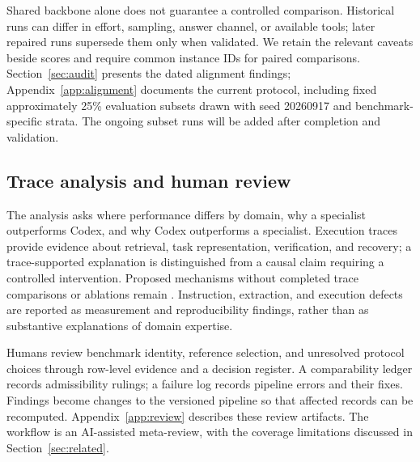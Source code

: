 Shared backbone alone does not guarantee a controlled comparison. Historical runs can differ in
effort, sampling, answer channel, or available tools; later repaired runs supersede them only when
validated. We retain the relevant caveats beside scores and require common instance IDs for
paired comparisons. Section~\ref{sec:audit} presents the dated alignment findings;
Appendix~\ref{app:alignment} documents the current protocol, including fixed approximately
25\% evaluation subsets drawn with seed 20260917 and benchmark-specific strata. The ongoing
subset runs will be added after completion and validation.

\subsection{Trace analysis and human review}
\label{sec:method:human}

The analysis asks where performance differs by domain, why a specialist outperforms Codex, and
why Codex outperforms a specialist. Execution traces provide evidence about retrieval, task
representation, verification, and recovery; a trace-supported explanation is distinguished from
a causal claim requiring a controlled intervention. Proposed mechanisms without completed trace
comparisons or ablations remain . Instruction, extraction, and
execution defects are reported as measurement and reproducibility findings, rather than as
substantive explanations of domain expertise.

Humans review benchmark identity, reference selection, and unresolved protocol choices through
row-level evidence and a decision register. A comparability ledger records admissibility rulings;
a failure log records pipeline errors and their fixes. Findings become changes to the versioned
pipeline so that affected records can be recomputed. Appendix~\ref{app:review} describes these
review artifacts. The workflow is an AI-assisted meta-review, with the coverage limitations
discussed in Section~\ref{sec:related}.
